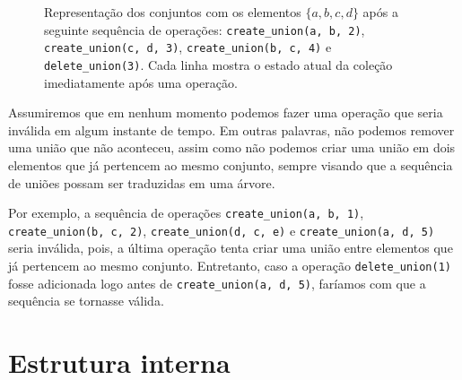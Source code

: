 \begin{figure}[h!]
\begin{subfigure}{\textwidth}
        \bigskip
    \end{subfigure}
    \begin{subfigure}{\textwidth}
        \centering
    \end{subfigure}
    \caption{Representação dos conjuntos com os elementos $\{a,b,c,d\}$ após a seguinte sequência de operações: \texttt{create\_union(a, b, 2)}, \texttt{create\_union(c, d, 3)}, \texttt{create\_union(b, c, 4)} e \texttt{delete\_union(3)}. Cada linha mostra o estado atual da coleção imediatamente após uma operação.}
    \label{fig:uf-sets}
\end{figure}

Assumiremos que em nenhum momento podemos fazer uma operação que seria inválida em algum instante de tempo. Em outras palavras, não podemos remover uma união que não aconteceu, assim como não podemos criar uma união em dois elementos que já pertencem ao mesmo conjunto, sempre visando que a sequência de uniões possam ser traduzidas em uma árvore.

Por exemplo, a sequência de operações \texttt{create\_union(a, b, 1)}, \texttt{create\_union(b, c, 2)}, \texttt{create\_union(d, c, e)} e \texttt{create\_union(a, d, 5)} seria inválida, pois, a última operação tenta criar uma união entre elementos que já pertencem ao mesmo conjunto. Entretanto, caso a operação \texttt{delete\_union(1)} fosse adicionada logo antes de \texttt{create\_union(a, d, 5)}, faríamos com que a sequência se tornasse válida.

\section{Estrutura interna}
\label{sec:uf-estrutura}

